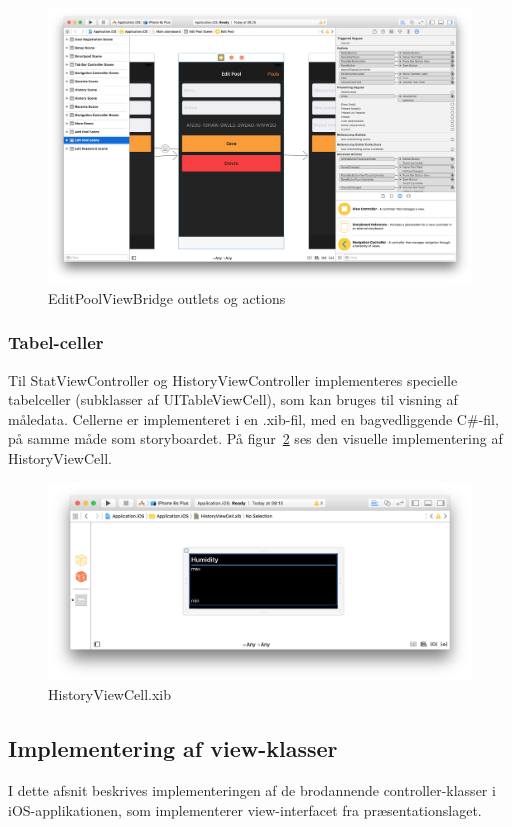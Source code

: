 \begin{figure}
	\centering
	\includegraphics[width=1.0\linewidth]{figs/implementering/ios_imp_actionsoutlets}
	\caption{EditPoolViewBridge outlets og actions}
	\label{fig:ios_imp_actionsoutlets}
\end{figure}

\subsubsection{Tabel-celler}
Til StatViewController og HistoryViewController implementeres specielle tabelceller (subklasser af UITableViewCell), som kan bruges til visning af måledata. Cellerne er implementeret i en .xib-fil, med en bagvedliggende C\#-fil, på samme måde som storyboardet. På figur~\ref{fig:ios_imp_historycell} ses den visuelle implementering af HistoryViewCell.

\begin{figure}
	\centering
	\includegraphics[width=0.8\linewidth]{figs/implementering/ios_imp_historycell}
	\caption{HistoryViewCell.xib}
	\label{fig:ios_imp_historycell}
\end{figure}

\subsection{Implementering af view-klasser}
I dette afsnit beskrives implementeringen af de brodannende controller-klasser i iOS-applikationen, som implementerer view-interfacet fra præsentationslaget.

